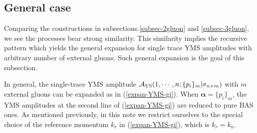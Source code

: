 \documentclass[preprint,showpacs,onecolumn,nofootinbib]{revtex4}
\def\eref#1{(\ref{#1})}
\def\a{{\alpha}}
\begin{document}
\subsection{General case}
\label{subsec-general}

Comparing the constructions in subsections.\ref{subsec-2gluon} and \ref{subsec-3gluon}, we see the processes bear strong similarity. This similarity implies the recursive pattern which yields the general expansion for single trace YMS amplitudes with arbitrary number of external gluons. Such general expansion is the goal of this subsection.

In general, the single-trace YMS amplitude ${\cal A}_{\rm YS}(1,\cdots,n;\{p_i\}_m|\sigma_{n+m})$ with $m$ external gluons can be expanded as
in \eref{expan-YMS-gi}. When $\pmb{\a}=\{p_i\}_m$, the YMS amplitudes at the second line of \eref{expan-YMS-gi} are reduced to pure BAS ones. As mentioned previously, in this note we restrict ourselves to the special choice of the reference momentum $k_r$ in \eref{expan-YMS-gi}, which is $k_r=k_n$.
\end{document}
